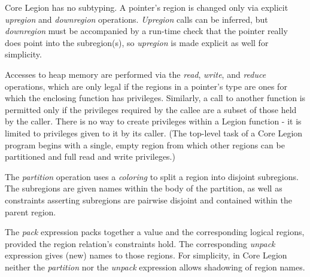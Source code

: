 Core Legion has no subtyping. A pointer's region is changed only via explicit
{\em upregion} and {\em downregion} operations.  {\em Upregion} calls can be inferred,
but {\em downregion} must be accompanied by a run-time check that the pointer really does
point into the subregion(s), so {\em upregion} is made explicit as well for simplicity.

Accesses to heap memory are performed via the {\em read}, {\em write}, and {\em reduce}
operations, which are only legal if the regions in a pointer's type are ones for which the
enclosing function has privileges.
Similarly, a call to another function is permitted only if the privileges required by the 
callee are a subset of those held by the caller.  There is no way to create privileges within
a Legion function - it is limited to privileges given to it by its caller.  (The
top-level task of a Core Legion program begins with a single, empty region from which other
regions can be partitioned and full read and
write privileges.)

The {\em partition} operation uses a {\em coloring} to split a region into 
disjoint subregions.  The subregions are given names within the body of the partition,
as well as constraints asserting subregions are pairwise disjoint and contained within the parent region.

The {\em pack} expression packs together a value and the corresponding logical regions,
provided the region relation's constraints hold.  The
corresponding {\em unpack} expression gives (new) names to those regions.  For simplicity, in Core Legion neither the 
{\em partition} nor the {\em unpack} expression allows shadowing of region names.

